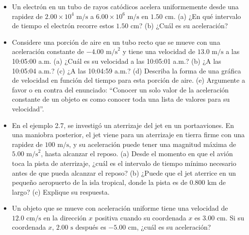 \documentclass[11pt,a4paper]{article}
\begin{document}
\begin{itemize}
    \item[\textbf{14.}] Un electrón en un tubo de rayos catódicos acelera uniformemente desde una rapidez de $2.00 \times 10^4 \text{ m/s}$ a $6.00 \times 10^6 \text{ m/s}$ en $1.50 \text{ cm}$. (a) ¿En qué intervalo de tiempo el electrón recorre estos $1.50 \text{ cm}$? (b) ¿Cuál es su aceleración?
    \vspace*{6cm}

    \item[\textbf{15.}] Considere una porción de aire en un tubo recto que se mueve con una aceleración constante de $-4.00 \text{ m/s}^2$ y tiene una velocidad de $13.0 \text{ m/s}$ a las 10:05:00 a.m. (a) ¿Cuál es su velocidad a las 10:05:01 a.m.? (b) ¿A las 10:05:04 a.m.? (c) ¿A las 10:04:59 a.m.? (d) Describa la forma de una gráfica de velocidad en función del tiempo para esta porción de aire. (e) Argumente a favor o en contra del enunciado: ``Conocer un solo valor de la aceleración constante de un objeto es como conocer toda una lista de valores para su velocidad''.
    \vspace*{7cm}

    \item[\textbf{16.}] En el ejemplo 2.7, se investigó un aterrizaje del jet en un portaaviones. En una maniobra posterior, el jet viene para un aterrizaje en tierra firme con una rapidez de $100 \text{ m/s}$, y su aceleración puede tener una magnitud máxima de $5.00 \text{ m/s}^2$, hasta alcanzar el reposo. (a) Desde el momento en que el avión toca la pista de aterrizaje, ¿cuál es el intervalo de tiempo mínimo necesario antes de que pueda alcanzar el reposo? (b) ¿Puede que el jet aterrice en un pequeño aeropuerto de la isla tropical, donde la pista es de $0.800 \text{ km}$ de largo? (c) Explique su respuesta.
    \vspace*{6cm}

    \item[\textbf{17.}] Un objeto que se mueve con aceleración uniforme tiene una velocidad de $12.0 \text{ cm/s}$ en la dirección $x$ positiva cuando su coordenada $x$ es $3.00 \text{ cm}$. Si su coordenada $x$, $2.00 \text{ s}$ después es $-5.00 \text{ cm}$, ¿cuál es su aceleración?
    \vspace*{6cm}
\end{itemize}

\newpage
\end{document}
